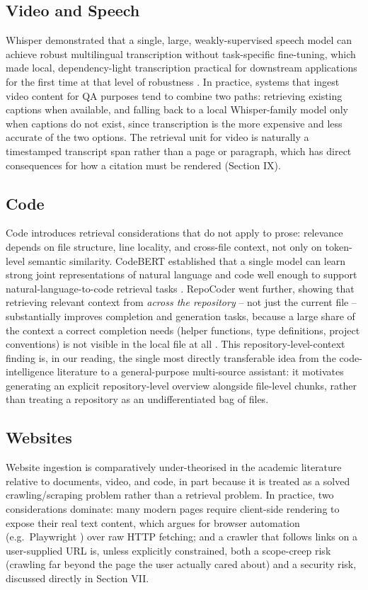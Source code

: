 \documentclass[conference]{IEEEtran}
\begin{document}
\subsection{Video and Speech}
Whisper demonstrated that a single, large, weakly-supervised speech
model can achieve robust multilingual transcription without
task-specific fine-tuning, which made local, dependency-light
transcription practical for downstream applications for the first time
at that level of robustness \cite{radford2023whisper}. In practice,
systems that ingest video content for QA purposes tend to combine two
paths: retrieving existing captions when available, and falling back to
a local Whisper-family model only when captions do not exist, since
transcription is the more expensive and less accurate of the two options.
The retrieval unit for video is naturally a timestamped transcript span
rather than a page or paragraph, which has direct consequences for how a
citation must be rendered (Section IX).

\subsection{Code}
Code introduces retrieval considerations that do not apply to prose:
relevance depends on file structure, line locality, and cross-file
context, not only on token-level semantic similarity. CodeBERT
established that a single model can learn strong joint representations
of natural language and code well enough to support natural-language-to-code
retrieval tasks \cite{feng2020codebert}. RepoCoder went further, showing
that retrieving relevant context from \emph{across the repository} --
not just the current file -- substantially improves completion and
generation tasks, because a large share of the context a correct
completion needs (helper functions, type definitions, project
conventions) is not visible in the local file at all \cite{zhang2023repocoder}.
This repository-level-context finding is, in our reading, the single
most directly transferable idea from the code-intelligence literature to
a general-purpose multi-source assistant: it motivates generating an
explicit repository-level overview alongside file-level chunks, rather
than treating a repository as an undifferentiated bag of files.

\subsection{Websites}
Website ingestion is comparatively under-theorised in the academic
literature relative to documents, video, and code, in part because it is
treated as a solved crawling/scraping problem rather than a retrieval
problem. In practice, two considerations dominate: many modern pages
require client-side rendering to expose their real text content, which
argues for browser automation (e.g.\ Playwright \cite{playwright2026})
over raw HTTP fetching; and a crawler that follows links on a
user-supplied URL is, unless explicitly constrained, both a scope-creep
risk (crawling far beyond the page the user actually cared about) and a
security risk, discussed directly in Section VII.
\end{document}
